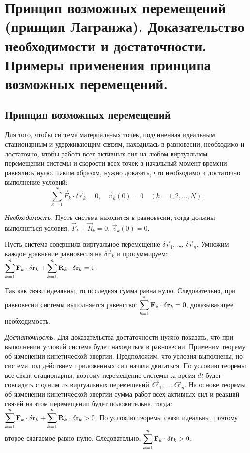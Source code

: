 \chapter{Принцип возможных перемещений (принцип Лагранжа). Доказательство
необходимости и достаточности. Примеры применения принципа возможных
перемещений.}

\section{Принцип возможных перемещений}
Для того, чтобы система материальных точек, подчиненная идеальным стационарным и
удерживающим связям, находилась в равновесии, необходимо и достаточно, чтобы
работа всех активных сил на любом виртуальном перемещении системы и скорости
всех точек в начальный момент времени равнялись нулю. Таким образом, нужно
доказать, что необходимо и достаточно выполнение условий:
\[
    \sum_{k=1}^N \vec{F}_k\cdot\delta\vec{r}_k = 0,\quad
    \vec{v}_k(0) = 0 \quad (k = 1, 2, \ldots, N).
\]

\emph{Необходимость.} Пусть система находится в равновесии, тогда должны
выполняться условия: \( \vec{F}_k + \vec{R}_k = 0,\ \vec{v}_k(0) = 0 \).

Пусть система совершила виртуальное перемещение \( \delta\vec{r}_1 \), \ldots,
\( \delta\vec{r}_n \). Умножим каждое уравнение равновесия на
\( \delta\vec{r}_k \) и просуммируем: \( \displaystyle \sum_{k=1}^n \boldsymbol{\mathrm{F}}_k\cdot\delta
\boldsymbol{\mathrm{r}}_k + \sum_{k=1}^n \boldsymbol{\mathrm{R}}_k\cdot\delta\boldsymbol{\mathrm{r}}_k = 0 \).
 
Так как связи идеальны, то последняя сумма равна нулю. Следовательно, при
равновесии системы выполняется равенство: \( \displaystyle \sum_{k=1}^n \boldsymbol{\mathrm{F}}_k\cdot
\delta\boldsymbol{\mathrm{r}}_k = 0 \), доказывающее необходимость.

\emph{Достаточность.} Для доказательства достаточности нужно показать, что при
выполнении условий система будет находиться в равновесии. Применим теорему об
изменении кинетической энергии. Предположим, что условия выполнены, но система
под действием приложенных сил начала двигаться. По условию теоремы все связи
стационарны, поэтому перемещение системы за время \( dt \) будет совпадать с
одним из виртуальных перемещений \( \delta\vec{r}_1, \ldots, \delta\vec{r}_n \).
На основе теоремы об изменении кинетической энергии сумма работ всех активных
сил и реакций связей на этом перемещении будет положительна, тогда:
\( \displaystyle \sum_{k=1}^n \boldsymbol{\mathrm{F}}_k\cdot\delta\boldsymbol{\mathrm{r}}_k + \sum_{k=1}^n \boldsymbol{\mathrm{R}}_k\cdot
\delta\boldsymbol{\mathrm{r}}_k > 0 \). По условию теоремы связи идеальны, поэтому второе
слагаемое равно нулю. Следовательно,
\( \displaystyle \sum_{k=1}^n \boldsymbol{\mathrm{F}}_k\cdot\delta\boldsymbol{\mathrm{r}}_k > 0 \).

